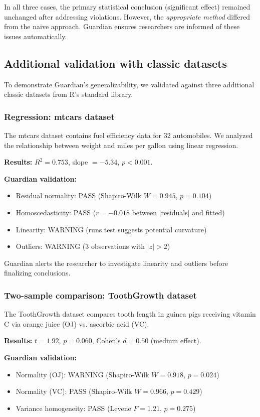 \documentclass[article]{jss}
\begin{document}
In all three cases, the primary statistical conclusion (significant effect) remained unchanged after addressing violations. However, the \emph{appropriate method} differed from the naive approach. Guardian ensures researchers are informed of these issues automatically.

\subsection{Additional validation with classic datasets}

To demonstrate Guardian's generalizability, we validated against three additional classic datasets from R's standard library.

\subsubsection{Regression: mtcars dataset}

The mtcars dataset contains fuel efficiency data for 32 automobiles. We analyzed the relationship between weight and miles per gallon using linear regression.

\textbf{Results:} $R^2 = 0.753$, slope $= -5.34$, $p < 0.001$.

\textbf{Guardian validation:}
\begin{itemize}
\item Residual normality: PASS (Shapiro-Wilk $W = 0.945$, $p = 0.104$)
\item Homoscedasticity: PASS ($r = -0.018$ between $|$residuals$|$ and fitted)
\item Linearity: WARNING (runs test suggests potential curvature)
\item Outliers: WARNING (3 observations with $|z| > 2$)
\end{itemize}

Guardian alerts the researcher to investigate linearity and outliers before finalizing conclusions.

\subsubsection{Two-sample comparison: ToothGrowth dataset}

The ToothGrowth dataset compares tooth length in guinea pigs receiving vitamin C via orange juice (OJ) vs. ascorbic acid (VC).

\textbf{Results:} $t = 1.92$, $p = 0.060$, Cohen's $d = 0.50$ (medium effect).

\textbf{Guardian validation:}
\begin{itemize}
\item Normality (OJ): WARNING (Shapiro-Wilk $W = 0.918$, $p = 0.024$)
\item Normality (VC): PASS (Shapiro-Wilk $W = 0.966$, $p = 0.429$)
\item Variance homogeneity: PASS (Levene $F = 1.21$, $p = 0.275$)
\end{itemize}
\end{document}
